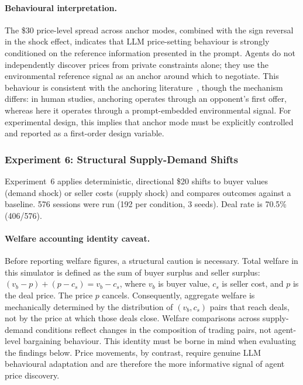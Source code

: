 \paragraph{Behavioural interpretation.}
The \$30 price-level spread across anchor modes, combined with the sign reversal in the shock effect, indicates that LLM price-setting behaviour is strongly conditioned on the reference information presented in the prompt.  Agents do not independently discover prices from private constraints alone; they use the environmental reference signal as an anchor around which to negotiate.  This behaviour is consistent with the anchoring literature~\cite{tversky1974,galinsky2001}, though the mechanism differs: in human studies, anchoring operates through an opponent's first offer, whereas here it operates through a prompt-embedded environmental signal.  For experimental design, this implies that anchor mode must be explicitly controlled and reported as a first-order design variable.

\subsubsection{Experiment 6: Structural Supply-Demand Shifts}
\label{sec:results-supply-demand}

Experiment~6 applies deterministic, directional \$20 shifts to buyer values (demand shock) or seller costs (supply shock) and compares outcomes against a baseline.  576 sessions were run (192 per condition, 3 seeds).  Deal rate is 70.5\% (406/576).

\paragraph{Welfare accounting identity caveat.}
Before reporting welfare figures, a structural caution is necessary.  Total welfare in this simulator is defined as the sum of buyer surplus and seller surplus: $(v_b - p) + (p - c_s) = v_b - c_s$, where $v_b$ is buyer value, $c_s$ is seller cost, and $p$ is the deal price.  The price $p$ cancels.  Consequently, aggregate welfare is mechanically determined by the distribution of $(v_b, c_s)$ pairs that reach deals, not by the price at which those deals close.  Welfare comparisons across supply-demand conditions reflect changes in the composition of trading pairs, not agent-level bargaining behaviour.  This identity must be borne in mind when evaluating the findings below.  Price movements, by contrast, require genuine LLM behavioural adaptation and are therefore the more informative signal of agent price discovery.

